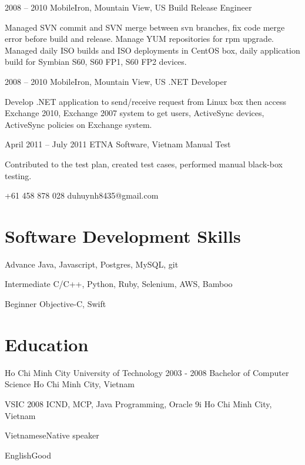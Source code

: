 \documentclass{tccv}
\begin{document}
\begin{eventlist}
\item{2008 -- 2010}
     {MobileIron, Mountain View, US}
     {Build Release Engineer}

Managed SVN commit and SVN merge between svn branches,
  fix code merge error before build and release.
\newline Manage YUM repositories for rpm upgrade.
\newline Managed daily ISO builds and ISO deployments in CentOS box,
  daily application build for Symbian S60, S60 FP1, S60 FP2 devices.

\item{2008 -- 2010}
     {MobileIron, Mountain View, US}
     {.NET Developer}

Develop .NET application to send/receive request from
  Linux box then access Exchange 2010, Exchange 2007
  system to get users, ActiveSync devices, ActiveSync
  policies on Exchange system.

\item{April 2011 -- July 2011}
     {ETNA Software, Vietnam}
     {Manual Test}

Contributed to the test plan, created test cases, performed manual black-box testing.

\end{eventlist}

    {+61 458 878 028}
    {duhuynh8435@gmail.com}
 

\section{Software Development Skills}

\begin{factlist}

\item{Advance}
     {Java, Javascript, Postgres, MySQL, git}

\item{Intermediate}
     {C/C++, Python, Ruby, Selenium, AWS, Bamboo}

\item{Beginner}
     {Objective-C, Swift}
\end{factlist}

\section{Education}

\begin{yearlist}

\item[Ho Chi Minh City University of Technology]{2003 - 2008}
     {Bachelor of Computer Science}
     {Ho Chi Minh City, Vietnam}

\item[VSIC]{2008}
     {ICND, MCP, Java Programming, Oracle 9i}
     {Ho Chi Minh City, Vietnam}

\end{yearlist}

\begin{factlist}
\item{Vietnamese}{Native speaker}
\item{English}{Good}
\end{factlist}
\end{document}
